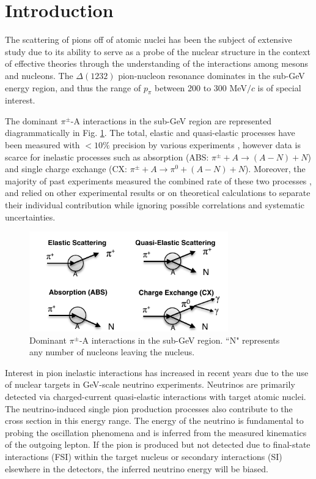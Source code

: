 \section{\label{sec:intro}Introduction\protect}
The scattering of pions off of atomic nuclei has been the subject of extensive study
due to its ability to serve as a probe of the nuclear structure in the context of effective theories through the understanding of the interactions among mesons and nucleons. The $\Delta(1232)$ {\color{red}pion}-nucleon resonance dominates in the sub-GeV energy region, {\color{red}and thus the range of $p_{\pi}$ between 200 to 300 MeV$/c$ is of special interest.}


The dominant $\pi^{\pm}$-A interactions in the sub-GeV region are represented diagrammatically in Fig. \ref{fig:interactions}. The total, elastic and quasi-elastic processes have been measured with $<10\%$ precision by various experiments \cite{Allardyce,Binon,Saunders,Gelderloos,Levenson,Ashery2,Ingram,Jones,Ashery,Bellotti1973,Bellotti1973_2}, however data is scarce for inelastic processes such as absorption (ABS: $\pi^{\pm}+A\rightarrow (A-N) + N$) and single charge exchange (CX: $\pi^{\pm} + A \rightarrow \pi^{0}+ (A-N) + N$). Moreover, the majority of past experiments measured the combined rate of these two processes \cite{gianneli,navon}, and relied on other experimental results or on theoretical calculations to separate their individual contribution while ignoring possible correlations and systematic uncertainties.

\begin{figure}[ht]
\includegraphics[width=86mm]{figures/Figure1_sep_paper_b_w.pdf}
\caption{Dominant $\pi^{\pm}$-A interactions in the sub-GeV region. ``N" represents any number of nucleons leaving the nucleus.}
\label{fig:interactions}
\end{figure}

Interest in pion inelastic interactions has increased in recent years due to the use of nuclear targets in GeV-scale neutrino experiments. Neutrinos are primarily detected via charged-current quasi-elastic interactions {\color{red} with} target atomic nuclei. The neutrino-induced single pion production processes also contribute to the cross section in this energy range. The energy of the neutrino is fundamental to probing the oscillation phenomena and is inferred from the measured kinematics of the outgoing lepton.  If the pion is produced but not detected due to final-state interactions (FSI) within the target nucleus or secondary interactions (SI) elsewhere in the detectors, the inferred neutrino energy will be biased. 

